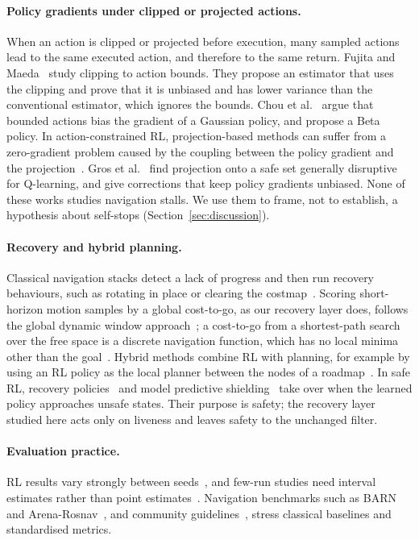 \documentclass[11pt]{article}
\theoremstyle{definition}
\theoremstyle{remark}
\begin{document}
\paragraph{Policy gradients under clipped or projected actions.} When an action is clipped or projected before execution, many sampled actions lead to the same executed action, and therefore to the same return. Fujita and Maeda~\cite{fujita2018capg} study clipping to action bounds. They propose an estimator that uses the clipping and prove that it is unbiased and has lower variance than the conventional estimator, which ignores the bounds. Chou et al.~\cite{chou2017beta} argue that bounded actions bias the gradient of a Gaussian policy, and propose a Beta policy. In action-constrained RL, projection-based methods can suffer from a zero-gradient problem caused by the coupling between the policy gradient and the projection~\cite{lin2021zerogradient}. Gros et al.~\cite{gros2020projection} find projection onto a safe set generally disruptive for Q-learning, and give corrections that keep policy gradients unbiased. None of these works studies navigation stalls. We use them to frame, not to establish, a hypothesis about self-stops (Section~\ref{sec:discussion}).

\paragraph{Recovery and hybrid planning.} Classical navigation stacks detect a lack of progress and then run recovery behaviours, such as rotating in place or clearing the costmap~\cite{marder2010office,macenski2020marathon2}. Scoring short-horizon motion samples by a global cost-to-go, as our recovery layer does, follows the global dynamic window approach~\cite{brock1999globaldwa}; a cost-to-go from a shortest-path search over the free space is a discrete navigation function, which has no local minima other than the goal~\cite{rimon1992navigation}. Hybrid methods combine RL with planning, for example by using an RL policy as the local planner between the nodes of a roadmap~\cite{faust2018prmrl}. In safe RL, recovery policies~\cite{thananjeyan2021recovery} and model predictive shielding~\cite{bastani2021mps,banerjee2024dmps} take over when the learned policy approaches unsafe states. Their purpose is safety; the recovery layer studied here acts only on liveness and leaves safety to the unchanged filter.

\paragraph{Evaluation practice.} RL results vary strongly between seeds~\cite{henderson2018matters}, and few-run studies need interval estimates rather than point estimates~\cite{agarwal2021precipice}. Navigation benchmarks such as BARN~\cite{perille2020barn} and Arena-Rosnav~\cite{kastner2023arena}, and community guidelines~\cite{francis2025principles}, stress classical baselines and standardised metrics.
\end{document}
